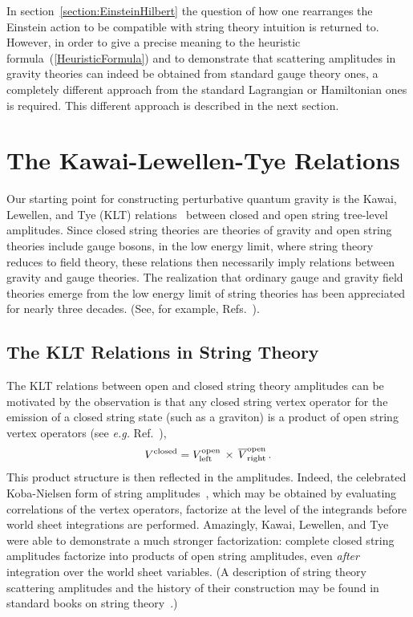 In section~\ref{section:EinsteinHilbert} the question of how one
rearranges the Einstein action to be compatible with string theory
intuition is returned to.  However, in order to give a precise meaning
to the heuristic formula~(\ref{HeuristicFormula}) and to demonstrate
that scattering amplitudes in gravity theories can indeed be
obtained from standard gauge theory ones, a completely different
approach from the standard Lagrangian or Hamiltonian ones is required.
This different approach is described in the next section.

\newpage

\section{The Kawai-Lewellen-Tye Relations}
\label{section:KLT_Relations}

Our starting point for constructing perturbative quantum gravity is
the Kawai, Lewellen, and Tye (KLT) relations~\cite{KLT} between closed
and open string tree-level amplitudes.  Since closed string theories are
theories of gravity and open string theories include gauge bosons, in
the low energy limit, where string theory reduces to field theory,
these relations then necessarily imply relations between gravity and
gauge theories. The realization that ordinary gauge and gravity
field theories emerge from the low energy limit of string theories 
has been appreciated for nearly three decades. (See, for example,
Refs.~\cite{Yoneya74,Scherk,Sannan86,GSB,GSW,Polchinski98A,Polchinski98B}).


\subsection{The KLT Relations in String Theory}

The KLT relations between open and closed string theory amplitudes
can be motivated by the observation is that any
closed string vertex operator for the emission of a closed string
state (such as a graviton) is a product of open string vertex
operators (see {\it e.g.} Ref.~\cite{GSW}),
%
\begin{equation}
V^{\rm closed} = V_{\rm left}^{\rm open}\, \times \,  
\overline{V}_{\rm right}^{\rm  open} \,.
\label{ClosedVertex}
\end{equation}
%
This product structure is then reflected in the amplitudes.  Indeed,
the celebrated Koba-Nielsen form of string
amplitudes~\cite{KobaNielsen}, which may be obtained by evaluating
correlations of the vertex operators, factorize at the level of the
integrands before world sheet integrations are performed.  Amazingly,
Kawai, Lewellen, and Tye were able to demonstrate a much stronger
factorization: complete closed string amplitudes factorize into
products of open string amplitudes, even {\it after} integration over
the world sheet variables.  (A description of string theory scattering
amplitudes and the history of their construction may be found in
standard books on string theory~\cite{GSW,Polchinski98A,Polchinski98B}.)

